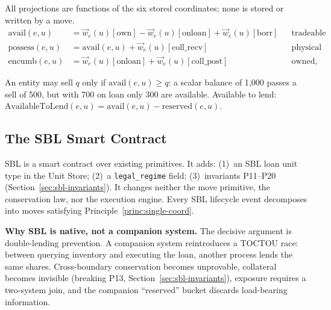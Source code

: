 \begin{definition}[Projections]
\label{def:projections}
All projections are functions of the six stored coordinates; none is stored or written by a move.
\begin{align*}
\mathrm{avail}(e,u)   &= \vec{w}_e(u)[\mathrm{own}] - \vec{w}_e(u)[\mathrm{onloan}] + \vec{w}_e(u)[\mathrm{borr}] && \text{tradeable inventory}\\
\mathrm{possess}(e,u) &= \mathrm{avail}(e,u) + \vec{w}_e(u)[\mathrm{coll\_recv}] && \text{physical custody}\\
\mathrm{encumb}(e,u)  &= \vec{w}_e(u)[\mathrm{onloan}] + \vec{w}_e(u)[\mathrm{coll\_post}] && \text{owned, not tradeable}
\end{align*}
\end{definition}

\noindent An entity may sell $q$ only if $\mathrm{avail}(e,u) \geq q$: a scalar balance of 1{,}000 passes a sell of 500, but with 700 on loan only 300 are available. Available to lend: $\text{AvailableToLend}(e,u) = \mathrm{avail}(e,u) - \mathrm{reserved}(e,u)$.

\subsection{The SBL Smart Contract}
\label{sec:sbl-contract}

\begin{principle}
\label{princ:sbl-representable}
SBL is a smart contract over existing primitives. It adds: (1)~an SBL loan unit type in the Unit Store; (2)~a \texttt{legal\_regime} field; (3)~invariants P11--P20 (Section~\ref{sec:sbl-invariants}). It changes neither the move primitive, the conservation law, nor the execution engine. Every SBL lifecycle event decomposes into moves satisfying Principle~\ref{princ:single-coord}.
\end{principle}

\noindent\textbf{Why SBL is native, not a companion system.} The decisive argument is double-lending prevention. A companion system reintroduces a TOCTOU race: between querying inventory and executing the loan, another process lends the same shares. Cross-boundary conservation becomes unprovable, collateral becomes invisible (breaking P13, Section~\ref{sec:sbl-invariants}), exposure requires a two-system join, and the companion ``reserved'' bucket discards load-bearing information.

